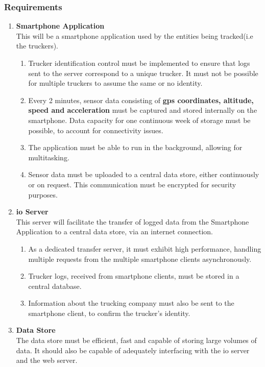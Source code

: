\subsubsection{Requirements}
\begin{enumerate}
\item \textbf{Smartphone Application}\\
    This will be a smartphone application used by the entities being tracked(i.e the truckers).
    \begin{enumerate}
        \item Trucker identification control must be implemented to ensure that logs sent to the server correspond to a unique trucker. It must not be possible for multiple truckers to assume the same or no identity.
        \item Every 2 minutes, sensor data consisting of \textbf{\ac{gps} coordinates, altitude, speed and acceleration} must be captured and stored internally on the smartphone. 
        Data capacity for one continuous week of storage must be possible, to account for connectivity issues.
        \item The application must be able to run in the background, allowing for multitasking.
        \item Sensor data must be uploaded to a central data store, either continuously or on request. This communication must be encrypted for security purposes.
    \end{enumerate}
\item \textbf{\ac{io} Server}\\
This server will facilitate the transfer of logged data from the Smartphone Application to a central data store, via an internet connection. 
    \begin{enumerate}
        \item As a dedicated transfer server, it must exhibit high performance, handling multiple requests from the multiple smartphone clients asynchronously.
        \item Trucker logs, received from smartphone clients, must be stored in a central database.
        \item Information about the trucking company must also be sent to the smartphone client, to confirm the trucker's identity.
    \end{enumerate}

\item \textbf{Data Store}\\
The data store must be efficient, fast and capable of storing large volumes of data.
It should also be capable of adequately interfacing with the \ac{io} server and the web server.


\end{enumerate}
